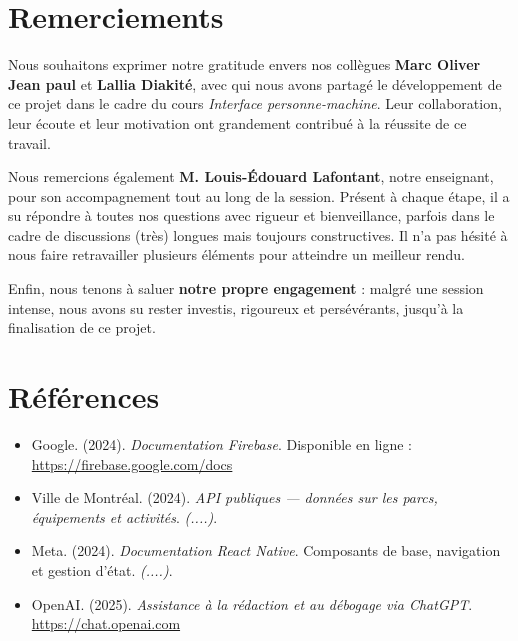 \documentclass[12pt,a4paper]{article}
\begin{document}
\clearpage
\section*{Remerciements}

Nous souhaitons exprimer notre gratitude envers nos collègues \textbf{Marc Oliver Jean paul} et \textbf{Lallia Diakité}, avec qui nous avons partagé le développement de ce projet dans le cadre du cours \textit{Interface personne-machine}. Leur collaboration, leur écoute et leur motivation ont grandement contribué à la réussite de ce travail.

Nous remercions également \textbf{M. Louis-Édouard Lafontant}, notre enseignant, pour son accompagnement tout au long de la session. Présent à chaque étape, il a su répondre à toutes nos questions avec rigueur et bienveillance, parfois dans le cadre de discussions (très) longues mais toujours constructives. Il n'a pas hésité à nous faire retravailler plusieurs éléments pour atteindre un meilleur rendu.

Enfin, nous tenons à saluer \textbf{notre propre engagement} : malgré une session intense, nous avons su rester investis, rigoureux et persévérants, jusqu'à la finalisation de ce projet.


\clearpage
\section*{Références}

\begin{itemize}

  \item Google. (2024). \textit{Documentation Firebase}. Disponible en ligne : \url{https://firebase.google.com/docs}

  \item Ville de Montréal. (2024). \textit{API publiques — données sur les parcs, équipements et activités}. \emph{(....)}.

  \item Meta. (2024). \textit{Documentation React Native}. Composants de base, navigation et gestion d'état. \emph{(....)}.

  \item OpenAI. (2025). \textit{Assistance à la rédaction et au débogage via ChatGPT}. \url{https://chat.openai.com}
\end{itemize}
\end{document}
